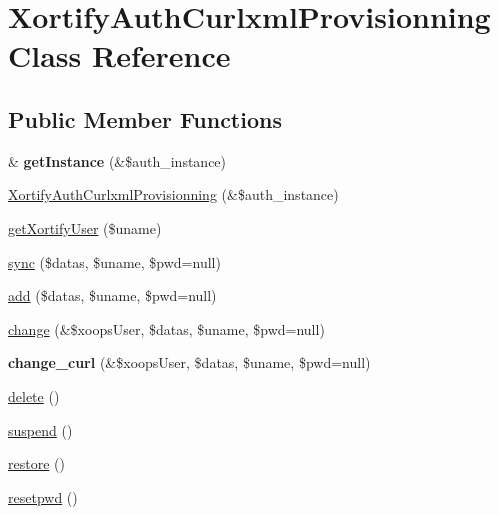 \hypertarget{class_xortify_auth_curlxml_provisionning}{\section{Xortify\-Auth\-Curlxml\-Provisionning Class Reference}
\label{class_xortify_auth_curlxml_provisionning}
}
\subsection*{Public Member Functions}
\begin{DoxyCompactItemize}
\item 
\hypertarget{class_xortify_auth_curlxml_provisionning_a2c8eaa915c70d75289ac8a03686194f9}{\& {\bfseries get\-Instance} (\&\$auth\-\_\-instance)}\label{class_xortify_auth_curlxml_provisionning_a2c8eaa915c70d75289ac8a03686194f9}

\item 
\hyperlink{class_xortify_auth_curlxml_provisionning_accc0d33e8eb86362d253e29bd29fcc2e}{Xortify\-Auth\-Curlxml\-Provisionning} (\&\$auth\-\_\-instance)
\item 
\hyperlink{class_xortify_auth_curlxml_provisionning_a041d726ac26672547ed1504e8e0117aa}{get\-Xortify\-User} (\$uname)
\item 
\hyperlink{class_xortify_auth_curlxml_provisionning_a35dc08b0f2138eb818ff95345b73bcff}{sync} (\$datas, \$uname, \$pwd=null)
\item 
\hyperlink{class_xortify_auth_curlxml_provisionning_adfc9fcef01e7bd7b2f47e8e79d51fc63}{add} (\$datas, \$uname, \$pwd=null)
\item 
\hyperlink{class_xortify_auth_curlxml_provisionning_ae1f0971b9712c794620cf309164e43af}{change} (\&\$xoops\-User, \$datas, \$uname, \$pwd=null)
\item 
\hypertarget{class_xortify_auth_curlxml_provisionning_aba6f598c234d191a3b3934f90b35fd9f}{{\bfseries change\-\_\-curl} (\&\$xoops\-User, \$datas, \$uname, \$pwd=null)}\label{class_xortify_auth_curlxml_provisionning_aba6f598c234d191a3b3934f90b35fd9f}

\item 
\hyperlink{class_xortify_auth_curlxml_provisionning_a13bdffdd926f26b825ea57066334ff01}{delete} ()
\item 
\hyperlink{class_xortify_auth_curlxml_provisionning_ad73006a505121228f3b075c2409787d2}{suspend} ()
\item 
\hyperlink{class_xortify_auth_curlxml_provisionning_aa1371f22826cf8cde4454c9b467203d0}{restore} ()
\item 
\hyperlink{class_xortify_auth_curlxml_provisionning_a06d70fbd3a2db390b6f2530c0076628e}{resetpwd} ()
\end{DoxyCompactItemize}
